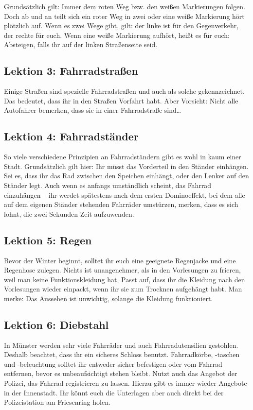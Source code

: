 \begin{multicols}{2}
Grundsätzlich gilt: Immer dem roten Weg bzw. den weißen Markierungen folgen. Doch ab und an teilt sich ein roter Weg in zwei oder eine weiße Markierung hört plötzlich auf. Wenn es zwei Wege gibt, gilt: der linke ist für den Gegenverkehr, der rechte für euch. Wenn eine weiße Markierung aufhört, heißt es für euch: Absteigen, falls ihr auf der linken Straßenseite seid.

\subsection*{Lektion 3: Fahrradstraßen}
Einige Straßen sind spezielle Fahrradstraßen und auch als solche gekennzeichnet. Das bedeutet, dass ihr in den Straßen Vorfahrt habt. Aber Vorsicht: Nicht alle Autofahrer bemerken, dass sie in einer Fahrradstraße sind\dots

\subsection*{Lektion 4: Fahrradständer}
So viele verschiedene Prinzipien an Fahrradständern gibt es wohl in kaum einer Stadt. Grundsätzlich gilt hier: Ihr müsst das Vorderteil in den Ständer einhängen. Sei es, dass ihr das Rad zwischen den Speichen einhängt, oder den Lenker auf den Ständer legt. Auch wenn es anfangs umständlich scheint, das Fahrrad einzuhängen -- ihr werdet spätestens nach dem ersten Dominoeffekt, bei dem alle auf dem eigenen Ständer stehenden Fahrräder umstürzen, merken, dass es sich lohnt, die zwei Sekunden Zeit aufzuwenden.

\subsection*{Lektion 5: Regen}
Bevor der Winter beginnt, solltet ihr euch eine geeignete Regenjacke und eine Regenhose zulegen. Nichts ist unangenehmer, als in den Vorlesungen zu frieren, weil man keine Funktionskleidung hat. Passt auf, dass ihr die Kleidung nach den Vorlesungen wieder einpackt, wenn ihr sie zum Trocknen aufgehängt habt. Man merke: Das Aussehen ist unwichtig, solange die Kleidung funktioniert.

\subsection*{Lektion 6: Diebstahl}
In Münster werden sehr viele Fahrräder und auch Fahrradutensilien gestohlen. Deshalb beachtet, dass ihr ein sicheres Schloss benutzt. Fahrradkörbe, -taschen und -beleuchtung solltet ihr entweder sicher befestigen oder vom Fahrrad entfernen, bevor es unbeaufsichtigt stehen bleibt. Nutzt auch das Angebot der Polizei, das Fahrrad registrieren zu lassen. Hierzu gibt es immer wieder Angebote in der Innenstadt. Ihr könnt euch die Unterlagen aber auch direkt bei der Polizeistation am Friesenring holen.


\end{multicols}
